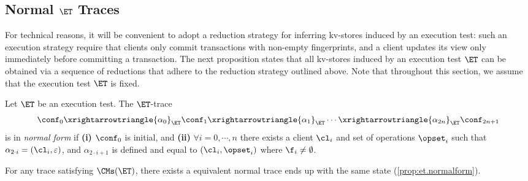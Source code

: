 \subsection{Normal \( \ET \) Traces}
\label{sec:normal-form-exist}
For technical reasons, it will be convenient to adopt a reduction strategy for inferring kv-stores induced by an 
execution test: such an execution strategy require that clients only commit transactions with non-empty fingerprints, 
and a client updates its view only immediately before committing a transaction. 
The next proposition states that all kv-stores induced by an execution test $\ET$ can be 
obtained via a sequence of reductions that adhere to the reduction strategy outlined above. 
Note that throughout this section, we assume that the execution test $\ET$ is fixed.

\begin{definition}
Let $\ET$ be an execution test. The $\ET$-trace
\[
\conf_0 \xrightarrowtriangle{\alpha_0}_{\ET} \conf_1 \xrightarrowtriangle{\alpha_1}_{\ET} \cdots \xrightarrowtriangle{\alpha_{2n}}_{\ET} \conf_{2n + 1}
\]
is in \emph{normal form} if \textbf{(i)} $\conf_0$ is initial, and 
\textbf{(ii)} $\forall i=0,\cdots, n$ there exists a client $\cl_i$ and set of operations $\opset_{i}$ such that 
$\alpha_{2 \cdot i} = (\cl_{i}, \varepsilon)$, and $\alpha_{2 \cdot i + 1}$ is defined and equal to $(\cl_{i}, \opset_{i})$ where \( \f_i \neq \emptyset \).
\end{definition}

For any trace satisfying \( \CMs(\ET) \), 
there exists a equivalent normal trace ends up with the same state (\cref{prop:et.normalform}).

